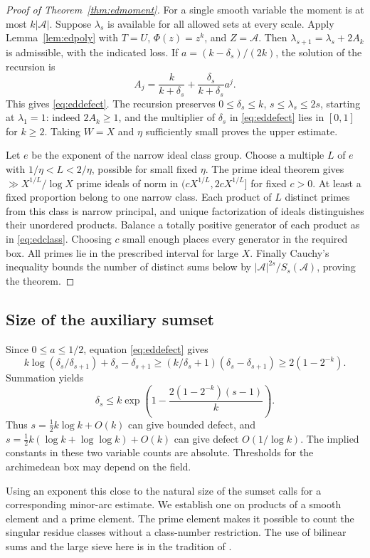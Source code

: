\documentclass[11pt,letterpaper]{article}
\theoremstyle{definition}
\numberwithin{equation}{section}
\begin{document}
\begin{proof}[Proof of Theorem~\ref{thm:edmoment}]
For a single smooth variable the moment is at most $k|\mathcal A|$.
Suppose $\lambda_s$ is available for all allowed sets at every scale.
Apply Lemma~\ref{lem:edpoly} with $T=U$, $\Phi(z)=z^k$, and
$Z=\mathcal A$. Then $\lambda_{s+1}=\lambda_s+2A_k$ is admissible,
with the indicated loss. If $a=(k-\delta_s)/(2k)$, the solution of the
recursion is
\[
 A_j=\frac{k}{k+\delta_s}
      +\frac{\delta_s}{k+\delta_s}a^j .
\]
This gives \eqref{eq:eddefect}. The recursion preserves
$0\le\delta_s\le k$, $s\le\lambda_s\le2s$, starting at $\lambda_1=1$:
indeed $2A_k\ge1$, and the multiplier of $\delta_s$ in
\eqref{eq:eddefect} lies in $[0,1]$ for $k\ge2$.
Taking $W=X$ and $\eta$ sufficiently small proves the upper estimate.

Let $e$ be the exponent of the narrow ideal class group. Choose a
multiple $L$ of $e$ with $1/\eta<L<2/\eta$, possible for small fixed
$\eta$. The prime ideal theorem gives $\gg X^{1/L}/\log X$ prime ideals
of norm in $(cX^{1/L},2cX^{1/L}]$ for fixed $c>0$. At least a fixed
proportion belong to one narrow class. Each product of $L$ distinct
primes from this class is narrow principal, and unique factorization of
ideals distinguishes their unordered products. Balance a totally
positive generator of each product as in \eqref{eq:edclass}. Choosing
$c$ small enough places every generator in the required box. All primes
lie in the prescribed interval for large $X$. Finally Cauchy's
inequality bounds the number of distinct sums below by
$|\mathcal A|^{2s}/S_s(\mathcal A)$, proving the theorem.
\end{proof}

\subsection{Size of the auxiliary sumset}
Since $0\le a\le1/2$, equation \eqref{eq:eddefect} gives
\[
 k\log(\delta_s/\delta_{s+1})+\delta_s-\delta_{s+1}
 \ge (k/\delta_s+1)(\delta_s-\delta_{s+1})
 \ge 2(1-2^{-k}).
\]
Summation yields
\[
 \delta_s\le k\exp\!\left(1-
               \frac{2(1-2^{-k})(s-1)}{k}\right).
\]
Thus $s=\tfrac12 k\log k+O(k)$ can give bounded defect, and
$s=\tfrac12 k(\log k+\log\log k)+O(k)$ can give defect
$O(1/\log k)$. The implied constants in these two variable counts
are absolute. Thresholds for the archimedean box may depend on the field.

Using an exponent this close to the natural size of the sumset calls
for a corresponding minor-arc estimate. We establish one on products
of a smooth element and a prime element. The prime element makes it
possible to count the singular residue classes without a class-number
restriction. The use of bilinear sums and the large sieve here is in
the tradition of \cite{edwooleysws}.
\end{document}
